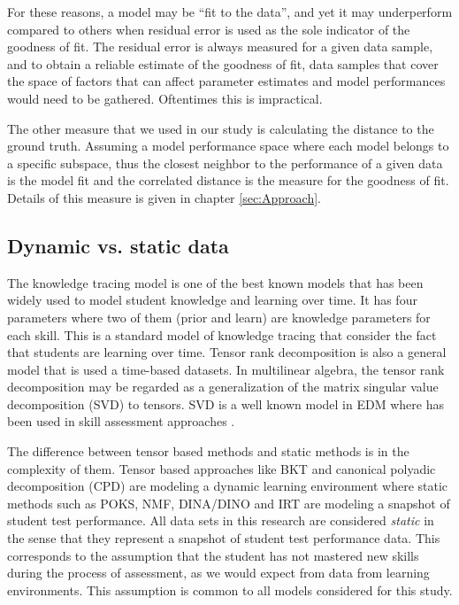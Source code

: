 For these reasons, a model may be ``fit to the data'', and yet it may underperform compared to others when residual error is used as the sole indicator of the goodness of fit.  The residual error is always measured for a given data sample, and to obtain a reliable estimate of the goodness of fit, data samples that cover the space of factors that can affect parameter estimates and model performances would need to be gathered.  Oftentimes this is impractical.

 The other measure that we used in our study is calculating the distance to the ground truth. Assuming a model performance space where each model belongs to a specific subspace, thus the closest neighbor to the performance of a given data is the model fit and the correlated distance is the measure for the goodness of fit. Details of this measure is given in chapter \ref{sec:Approach}.






\subsection{Dynamic vs. static data}

The knowledge tracing model \citep{corbett1994knowledge} is one of the best known models that has been widely used to model student knowledge and learning over time. It has four parameters where two of them (prior and learn) are knowledge parameters for each skill. This is a standard model of knowledge tracing that consider the fact that students are learning over time. Tensor rank decomposition is also a general model that is used a time-based datasets. In multilinear algebra, the tensor rank decomposition may be regarded as a generalization of the matrix singular value decomposition (SVD) to tensors. SVD is a well known model in EDM where has been used in skill assessment approaches \citep{Beheshti2012Numbers}.

The difference between tensor based methods and static methods is in the complexity of them. Tensor based approaches like BKT and canonical polyadic decomposition (CPD) are modeling a dynamic learning environment where static methods such as POKS, NMF, DINA/DINO and IRT are modeling a snapshot of student test performance. All data sets in this research are considered \textit{static} in the sense that they represent a snapshot of student test performance data.  This corresponds to the assumption that the student has not mastered new skills during the process of assessment, as we would expect from data from learning environments.  This assumption is common to all models considered for this study.


